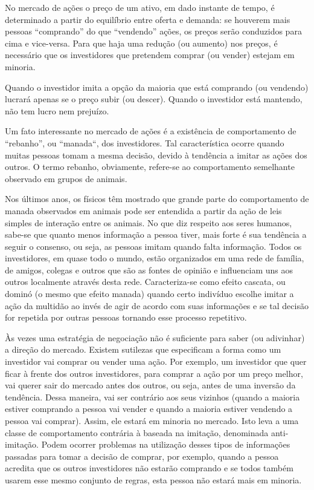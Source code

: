 \documentclass[brazil,ruledheader]{abnt}
\begin{document}
No mercado de ações o preço de um ativo, em dado instante de tempo, é
determinado a partir do equilíbrio entre oferta e demanda: se houverem
mais pessoas ``comprando'' do que ``vendendo'' ações, os preços serão conduzidos
para cima e vice-versa. Para que haja uma redução (ou aumento) nos preços,
é necessário que os investidores que pretendem comprar (ou vender) estejam
em minoria.

Quando o investidor imita a opção da maioria que está comprando (ou
vendendo) lucrará apenas se o preço subir (ou descer). Quando o investidor
está mantendo, não tem lucro nem prejuízo.

Um fato interessante no mercado de ações é a existência de comportamento
de ``rebanho'', ou ``manada``, dos investidores. Tal característica ocorre
quando muitas pessoas tomam a mesma decisão, devido à tendência a imitar as
ações dos outros. O termo rebanho, obviamente, refere-se ao
comportamento semelhante observado em grupos de animais.

Nos últimos anos, os físicos têm mostrado que grande parte do comportamento
de manada observados em animais pode ser entendida a partir da ação de leis
simples  de interação entre os animais. No que diz respeito aos seres
humanos, sabe-se que quanto menos informação a pessoa tiver, mais forte é
sua tendência a seguir o consenso, ou seja, as pessoas imitam quando
falta informação. Todos os investidores, em quase todo o mundo, estão
organizados em uma rede de família, de amigos, colegas e outros que são as
fontes
de opinião e influenciam uns aos outros localmente através desta
rede. Caracteriza-se como efeito cascata, ou dominó (o mesmo que efeito manada)
quando certo indivíduo
escolhe imitar a ação da multidão ao invés de agir de acordo com suas
informações e se tal decisão for repetida por outras pessoas tornando
esse processo repetitivo.

Às vezes uma estratégia de negociação não é suficiente para saber (ou
adivinhar) a direção do mercado. Existem sutilezas que especificam a forma como
um  investidor vai comprar ou vender uma ação. Por exemplo, um investidor
que quer ficar à frente dos outros investidores, para comprar a ação por um
preço melhor, vai querer sair do mercado antes dos outros, ou seja, antes de
uma inversão da tendência. Dessa maneira, vai ser contrário aos seus
vizinhos (quando a maioria estiver comprando a pessoa vai vender e quando
a maioria estiver vendendo a pessoa vai comprar). Assim, ele estará em minoria
no mercado. Isto leva a uma classe de comportamento contrária à baseada
na imitação, denominada anti-imitação. Podem ocorrer problemas na
utilização desses tipos de informações passadas para tomar a decisão de
comprar, por exemplo, quando a pessoa acredita que os outros investidores
não estarão comprando e se todos também usarem esse mesmo conjunto de
regras, esta pessoa não estará mais em minoria. 
\end{document}
